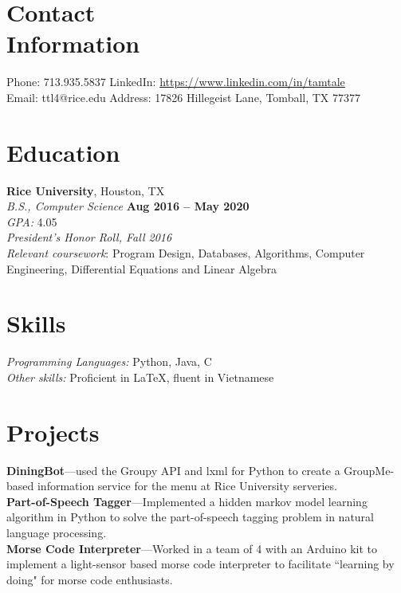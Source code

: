 \documentclass[margin,line]{resume}
\begin{document}
\begin{resume}
    \section{\mysidestyle Contact\\Information}

    Phone: 713.935.5837       \hfill LinkedIn: \url{https://www.linkedin.com/in/tamtale
} \\
    \noindent Email: ttl4@rice.edu  \hfill
    Address: 17826 Hillegeist Lane, Tomball, TX 77377

    \section{\mysidestyle Education}

    \textbf{Rice University}, Houston, TX \vspace{1mm}\\
    \textsl{B.S., Computer Science} \hfill \textbf{Aug 2016 -- May 2020} \vspace{1mm}\\
    \textsl{GPA: } 4.05 \vspace{1mm}\\
    \textsl{President's Honor Roll, Fall 2016} \vspace{1mm} \\
    \textsl{Relevant coursework}: Program Design, Databases, Algorithms, Computer Engineering, Differential Equations and Linear Algebra

    \section{\mysidestyle Skills}

    \emph{Programming Languages:} Python, Java, C \\
    \emph{Other skills:} Proficient in \LaTeX, fluent in Vietnamese

    \section{\mysidestyle Projects}

    \textbf{DiningBot}---used the Groupy API and lxml for Python to create a GroupMe-based information service for the menu at Rice University serveries.\vspace{1mm}\\
    \textbf{Part-of-Speech Tagger}---Implemented a hidden markov model learning algorithm in Python to solve the part-of-speech tagging problem in natural language processing.\vspace{1mm}\\
    \textbf{Morse Code Interpreter}---Worked in a team of 4 with an Arduino kit to implement a light-sensor based morse code interpreter to facilitate ``learning by doing" for morse code enthusiasts.


\end{resume}
\end{document}
